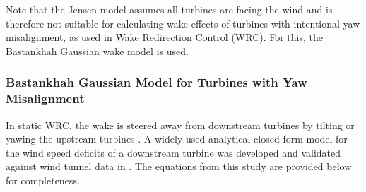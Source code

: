 Note that the Jensen model assumes all turbines are facing the wind and is therefore not suitable for calculating wake effects of turbines with intentional yaw misalignment, as used in Wake Redirection Control (WRC). For this, the Bastankhah Gaussian wake model is used.

\subsubsection{Bastankhah Gaussian Model for Turbines with Yaw Misalignment}\label{secBastankhah}
In static WRC, the wake is steered away from downstream turbines by tilting or yawing the upstream turbines \cite{fleming2014evaluating}. A widely used analytical closed-form model for the wind speed deficits of a downstream turbine was developed and validated against wind tunnel data in \cite{bastankhah2016experimental}. The equations from this study are provided below for completeness.

